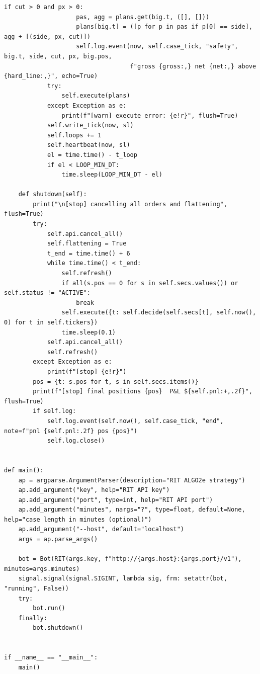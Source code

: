 \begin{lstlisting}[style=algocode]
                if cut > 0 and px > 0:
                    pas, agg = plans.get(big.t, ([], []))
                    plans[big.t] = ([p for p in pas if p[0] == side], agg + [(side, px, cut)])
                    self.log.event(now, self.case_tick, "safety", big.t, side, cut, px, big.pos,
                                   f"gross {gross:,} net {net:,} above {hard_line:,}", echo=True)
            try:
                self.execute(plans)
            except Exception as e:
                print(f"[warn] execute error: {e!r}", flush=True)
            self.write_tick(now, sl)
            self.loops += 1
            self.heartbeat(now, sl)
            el = time.time() - t_loop
            if el < LOOP_MIN_DT:
                time.sleep(LOOP_MIN_DT - el)

    def shutdown(self):
        print("\n[stop] cancelling all orders and flattening", flush=True)
        try:
            self.api.cancel_all()
            self.flattening = True
            t_end = time.time() + 6
            while time.time() < t_end:
                self.refresh()
                if all(s.pos == 0 for s in self.secs.values()) or self.status != "ACTIVE":
                    break
                self.execute({t: self.decide(self.secs[t], self.now(), 0) for t in self.tickers})
                time.sleep(0.1)
            self.api.cancel_all()
            self.refresh()
        except Exception as e:
            print(f"[stop] {e!r}")
        pos = {t: s.pos for t, s in self.secs.items()}
        print(f"[stop] final positions {pos}  P&L ${self.pnl:+,.2f}", flush=True)
        if self.log:
            self.log.event(self.now(), self.case_tick, "end", note=f"pnl {self.pnl:.2f} pos {pos}")
            self.log.close()


def main():
    ap = argparse.ArgumentParser(description="RIT ALGO2e strategy")
    ap.add_argument("key", help="RIT API key")
    ap.add_argument("port", type=int, help="RIT API port")
    ap.add_argument("minutes", nargs="?", type=float, default=None, help="case length in minutes (optional)")
    ap.add_argument("--host", default="localhost")
    args = ap.parse_args()

    bot = Bot(RIT(args.key, f"http://{args.host}:{args.port}/v1"), minutes=args.minutes)
    signal.signal(signal.SIGINT, lambda sig, frm: setattr(bot, "running", False))
    try:
        bot.run()
    finally:
        bot.shutdown()


if __name__ == "__main__":
    main()
\end{lstlisting}
